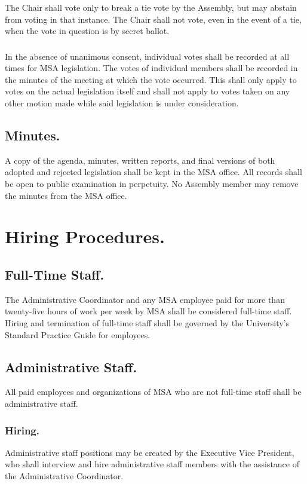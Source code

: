 \subsubsubsection{}
The Chair shall vote only to break a tie vote by the Assembly, but may abstain from voting in that instance.  The Chair shall not vote, even in the event of a tie, when the vote in question is by secret ballot.

\subsubsection{}
In the absence of unanimous consent, individual votes shall be recorded at all times for MSA legislation. The votes of individual members shall be recorded in the minutes of the meeting at which the vote occurred. This shall only apply to votes on the actual legislation itself and shall not apply to votes taken on any other motion made while said legislation is under consideration. 

\subsection{Minutes.}  A copy of the agenda, minutes, written reports, and final versions of both adopted and rejected legislation shall be kept in the MSA office.  All records shall be open to public examination in perpetuity.  No Assembly member may remove the minutes from the MSA office.


\section{Hiring Procedures.}  

\subsection{Full-Time Staff.}  The Administrative Coordinator and any MSA employee paid for more than twenty-five hours of work per week by MSA shall be considered full-time staff.  Hiring and termination of full-time staff shall be governed by the University’s Standard Practice Guide for employees.

\subsection{Administrative Staff.}  All paid employees and organizations of MSA who are not full-time staff shall be administrative staff.

\subsubsection{Hiring.}  Administrative staff positions may be created by the Executive Vice President, who shall interview and hire administrative staff members with the assistance of the Administrative Coordinator.

